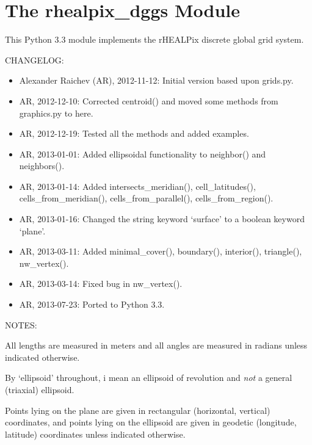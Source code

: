 \documentclass[a4paper,12ptopenany,oneside]{sphinxmanual}
\begin{document}
\chapter{The rhealpix\_dggs Module}
\label{rhealpix_dggs:the-rhealpix-dggs-module}\label{rhealpix_dggs:module-rhealpix_dggs}\label{rhealpix_dggs::doc}
This Python 3.3 module implements the rHEALPix discrete global grid system.

CHANGELOG:
\begin{itemize}
\item {} 
Alexander Raichev (AR), 2012-11-12: Initial version based upon grids.py.

\item {} 
AR, 2012-12-10: Corrected centroid() and moved some methods from graphics.py to here.

\item {} 
AR, 2012-12-19: Tested all the methods and added examples.

\item {} 
AR, 2013-01-01: Added ellipsoidal functionality to neighbor() and neighbors().

\item {} 
AR, 2013-01-14: Added intersects\_meridian(), cell\_latitudes(), cells\_from\_meridian(), cells\_from\_parallel(), cells\_from\_region().

\item {} 
AR, 2013-01-16: Changed the string keyword `surface' to a boolean keyword `plane'.

\item {} 
AR, 2013-03-11: Added minimal\_cover(), boundary(), interior(), triangle(), nw\_vertex().

\item {} 
AR, 2013-03-14: Fixed bug in nw\_vertex().

\item {} 
AR, 2013-07-23: Ported to Python 3.3.

\end{itemize}

NOTES:

All lengths are measured in meters and all angles are measured in radians 
unless indicated otherwise.

By `ellipsoid' throughout, i mean an ellipsoid of revolution and \emph{not} a general (triaxial) ellipsoid.

Points lying on the plane are given in rectangular (horizontal, vertical) coordinates, and points lying on the ellipsoid are given in geodetic (longitude, latitude) coordinates unless indicated otherwise.
\end{document}
